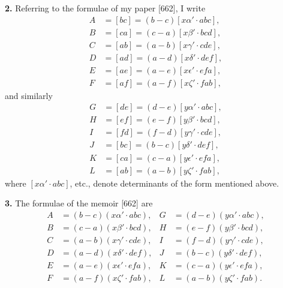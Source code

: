 \documentclass[11pt,a4paper]{book}
\begin{document}
\smallskip

\noindent\textbf{2.} Referring to the formulae of my paper [662], I write
\begin{align*}
A &= [bc] = (b - c)[x\alpha' \cdot abc], \\
B &= [ca] = (c - a)[x\beta' \cdot bcd], \\
C &= [ab] = (a - b)[x\gamma' \cdot cde], \\
D &= [ad] = (a - d)[x\delta' \cdot def], \\
E &= [ae] = (a - e)[x\epsilon' \cdot efa], \\
F &= [af] = (a - f)[x\zeta' \cdot fab],
\end{align*}
and similarly
\begin{align*}
G &= [de] = (d - e)[y\alpha' \cdot abc], \\
H &= [ef] = (e - f)[y\beta' \cdot bcd], \\
I &= [fd] = (f - d)[y\gamma' \cdot cde], \\
J &= [bc] = (b - c)[y\delta' \cdot def], \\
K &= [ca] = (c - a)[y\epsilon' \cdot efa], \\
L &= [ab] = (a - b)[y\zeta' \cdot fab],
\end{align*}
where $[x\alpha' \cdot abc]$, etc., denote determinants of the form mentioned above.

\smallskip

\noindent\textbf{3.} The formulae of the memoir [662] are
\begin{align*}
A &= (b - c)(x\alpha' \cdot abc), & G &= (d - e)(y\alpha' \cdot abc), \\
B &= (c - a)(x\beta' \cdot bcd), & H &= (e - f)(y\beta' \cdot bcd), \\
C &= (a - b)(x\gamma' \cdot cde), & I &= (f - d)(y\gamma' \cdot cde), \\
D &= (a - d)(x\delta' \cdot def), & J &= (b - c)(y\delta' \cdot def), \\
E &= (a - e)(x\epsilon' \cdot efa), & K &= (c - a)(y\epsilon' \cdot efa), \\
F &= (a - f)(x\zeta' \cdot fab), & L &= (a - b)(y\zeta' \cdot fab).
\end{align*}

\smallskip
\end{document}
